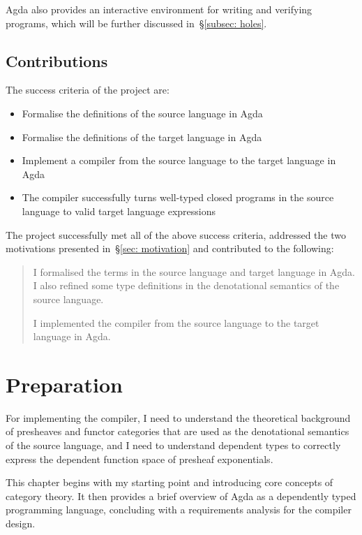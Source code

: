 \documentclass[12pt,a4paper]{report}
\theoremstyle{definition}
\newcounter{motivation}
\newcommand{\secref}[1]{\S\ref{#1}}
\begin{document}
        Agda also provides an interactive environment for writing and verifying programs, which will be further discussed in~\secref{subsec: holes}.

    \section{Contributions} \label{sec: contributions}
        The success criteria of the project are:
        \begin{itemize}
            \item 
                Formalise the definitions of the source language in Agda
            \item 
                Formalise the definitions of the target language in Agda
            \item
                Implement a compiler from the source language to the target language in Agda
            \item 
                The compiler successfully turns well-typed closed programs in the source language to valid target language expressions
        \end{itemize}

        The project successfully met all of the above success criteria, addressed the two motivations presented in~\secref{sec: motivation} and contributed to the following:
        \begin{quote}            
            \savedmotivationI
            I formalised the terms in the source language and target language in Agda. I also refined some type definitions in the denotational semantics of the source language.
            
            \savedmotivationII
            I implemented the compiler from the source language to the target language in Agda. 
        \end{quote}



\chapter{Preparation}
    \minitoc

    For implementing the compiler, I need to understand the theoretical background of presheaves and functor categories that are used as the denotational semantics of the source language, and I need to understand dependent types to correctly express the dependent function space of presheaf exponentials. 
    
    This chapter begins with my starting point and introducing core concepts of category theory. It then provides a brief overview of Agda as a dependently typed programming language, concluding with a requirements analysis for the compiler design.
\end{document}
